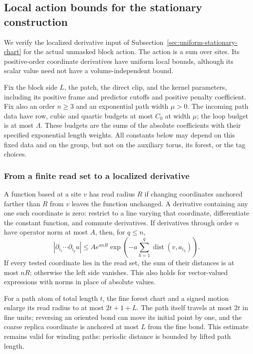 \subsection{Local action bounds for the stationary construction}
\label{sec:stationary-action-prices}
We verify the localized derivative input of
Subsection~\ref{sec:uniform-stationary-chart} for the actual unmasked
block action. The action is a sum over sites. Its positive-order
coordinate derivatives have uniform local bounds, although its
scalar value need not have a volume-independent bound.

Fix the block side $L$, the patch, the direct clip, and the kernel
parameters, including its positive frame and predictor cutoffs and
positive penalty coefficient. Fix also an order $n\ge3$ and an
exponential path width $\mu>0$. The incoming path data have row, cubic and quartic
budgets at most $C_0$ at width $\mu$; the loop budget is at most
$\Lambda$. These budgets are the sums of the absolute coefficients
with their specified exponential length weights. All constants
below may depend on this fixed data and on the group, but not on
the auxiliary torus, its forest, or the tag choices.

\subsubsection{From a finite read set to a localized derivative}
A function based at a site $v$ has read radius $R$ if changing
coordinates anchored farther than $R$ from $v$ leaves the function
unchanged. A derivative containing any one such coordinate is zero:
restrict to a line varying that coordinate, differentiate the
constant function, and commute derivatives. If derivatives through
order $n$ have operator norm at most $A$, then, for $q\le n$,
\begin{equation}\label{eq:stationary-read-price}
 |\partial_{i_1}\cdots\partial_{i_q}u|
 \le Ae^{anR}\exp\!\left(-a\sum_{h=1}^q
                               \operatorname{dist}(v,a_{i_h})\right).
\end{equation}
If every tested coordinate lies in the read set, the sum of their
distances is at most $nR$; otherwise the left side vanishes.
This also holds for vector-valued expressions with norms in place
of absolute values.

For a path atom of total length $t$, the fine forest chart and a
signed motion enlarge its read radius to at most
$2t+1+L$. The path itself travels at most $2t$ in fine units;
reversing an oriented bond can move its initial point by one,
and the coarse replica coordinate is anchored at most $L$ from
the fine bond. This estimate remains valid for winding paths:
periodic distance is bounded by lifted path length.

